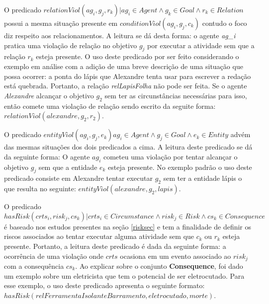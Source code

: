 O predicado $ relationViol(ag_i,g_j,r_k) | ag_i \in Agent \wedge g_k \in Goal \wedge r_k \in Relation $ possui a mesma situação presente em $ conditionViol(ag_i,g_j,c_k) $ contudo o foco diz respeito aos relacionamentos. A leitura se dá desta forma: o agente \textit{ag\_i} pratica uma violação de relação no objetivo $g_j$ por executar a atividade sem que a relação $r_k$ esteja presente. O uso deste predicado por ser feito considerando o exemplo em análise com a adição de uma breve descrição de uma situação que possa ocorrer: a ponta do lápis que Alexandre tenta usar para escrever a redação está quebrada. Portanto, a relação \textit{relLapisFolha} não pode ser feita. Se o agente \textit{Alexandre} alcançar o objetivo $g_2$ sem ter as circunstâncias necessárias para isso, então comete uma violação de relação sendo escrito da seguite forma: $relationViol(alexandre,g_2,r_2)$.

O predicado $ entityViol(ag_i,g_j,e_k) ag_i \in Agent \wedge g_j \in Goal \wedge e_k \in Entity$ advém das mesmas situações dos dois predicados a cima. A leitura deste predicado se dá da seguinte forma: O agente $ag_i$ cometeu uma violação por tentar alcançar o objetivo $g_j$ sem que a entidade $e_k$ esteja presente. No exemplo padrão o uso deste predicado consiste em Alexandre tentar executar $g_2$ sem ter a entidade lápis o que resulta no seguinte: $entityViol(alexandre, g_2, lapis)$.

O predicado $ hasRisk(crts_i, risk_j, cs_k) | crts_i \in Circumstance \wedge  risk_j \in Risk \wedge cs_k \in Consequence $ é baseado nos estudos presentes na seção \ref{risksec} e tem a finalidade de definir os riscos associados ao tentar executar alguma atividade sem que $c_k$ ou $r_k$ esteja presente. Portanto, a leitura deste predicado é dada da seguinte forma: a ocorrência de uma violação onde $crts$ ocasiona em um evento associado ao $risk_j$ com a consequência $cs_k$. Ao explicar sobre o conjunto \textbf{Consequence}, foi dado um exemplo sobre um eletricista que tem o potencial de ser eletrocutado. Para esse exemplo, o uso deste predicado apresenta o seguinte formato: $hasRisk(relFerramentaIsolanteBarramento, eletrocutado, morte)$.

